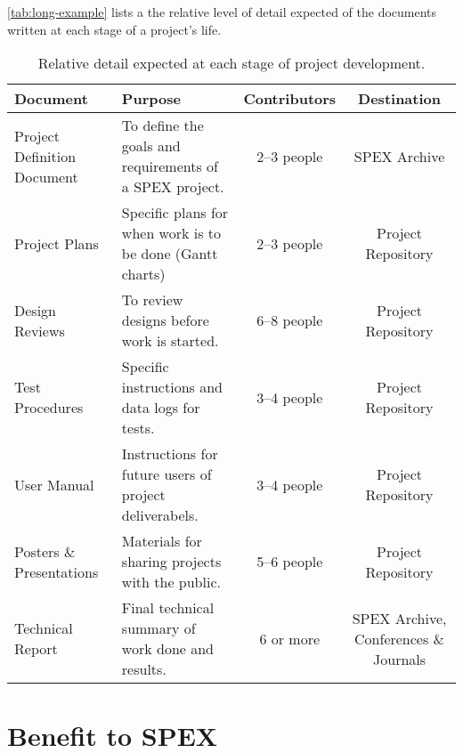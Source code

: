 \documentclass[conference]{IEEEtran} %
\begin{document}
\autoref{tab:long-example} lists a the relative level of detail expected of the documents written at each stage of a project's life.

\begin{table*}
    \caption{Relative detail expected at each stage of project development.}
    \centering
    \begin{tabular}{@{}llcc@{}}
        \toprule %
        Document & Purpose & Contributors & Destination \\
        \midrule %
        Project Definition Document & To define the goals and requirements of a SPEX project. & 2--3 people & SPEX Archive \\
        Project Plans & Specific plans for when work is to be done (Gantt charts) & 2--3 people & Project Repository \\
        Design Reviews & To review designs before work is started. & 6--8 people & Project Repository \\
        Test Procedures & Specific instructions and data logs for tests. & 3--4 people & Project Repository \\
        User Manual & Instructions for future users of project deliverabels. & 3--4 people & Project Repository \\
        Posters \& Presentations & Materials for sharing projects with the public. & 5--6 people & Project Repository \\
        Technical Report & Final technical summary of work done and results. & 6 or more & SPEX Archive, Conferences \& Journals \\
        \bottomrule
    \end{tabular}
\label{tab:long-example}
\end{table*}

\section{Benefit to SPEX}
\label{sec:benefit}
\end{document}
